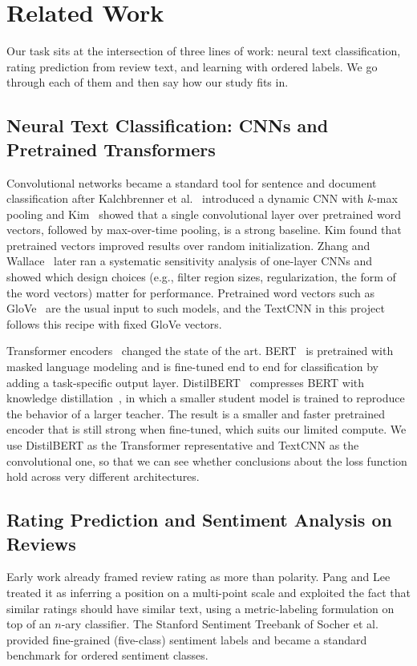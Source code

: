 \section{Related Work}
\label{sec:related}

Our task sits at the intersection of three lines of work: neural text classification, rating prediction from review text, and learning with ordered labels. We go through each of them and then say how our study fits in.

\subsection{Neural Text Classification: CNNs and Pretrained Transformers}
Convolutional networks became a standard tool for sentence and document classification after Kalchbrenner et al.~\cite{kalchbrenner2014} introduced a dynamic CNN with $k$-max pooling and Kim~\cite{kim2014} showed that a single convolutional layer over pretrained word vectors, followed by max-over-time pooling, is a strong baseline. Kim found that pretrained vectors improved results over random initialization. Zhang and Wallace~\cite{zhangwallace2017} later ran a systematic sensitivity analysis of one-layer CNNs and showed which design choices (e.g., filter region sizes, regularization, the form of the word vectors) matter for performance. Pretrained word vectors such as GloVe~\cite{pennington2014} are the usual input to such models, and the TextCNN in this project follows this recipe with fixed GloVe vectors.

Transformer encoders~\cite{vaswani2017} changed the state of the art. BERT~\cite{devlin2019} is pretrained with masked language modeling and is fine-tuned end to end for classification by adding a task-specific output layer. DistilBERT~\cite{sanh2019} compresses BERT with knowledge distillation~\cite{hinton2015}, in which a smaller student model is trained to reproduce the behavior of a larger teacher. The result is a smaller and faster pretrained encoder that is still strong when fine-tuned, which suits our limited compute. We use DistilBERT as the Transformer representative and TextCNN as the convolutional one, so that we can see whether conclusions about the loss function hold across very different architectures.

\subsection{Rating Prediction and Sentiment Analysis on Reviews}
Early work already framed review rating as more than polarity. Pang and Lee~\cite{pang2005} treated it as inferring a position on a multi-point scale and exploited the fact that similar ratings should have similar text, using a metric-labeling formulation on top of an $n$-ary classifier. The Stanford Sentiment Treebank of Socher et al.~\cite{socher2013} provided fine-grained (five-class) sentiment labels and became a standard benchmark for ordered sentiment classes.

